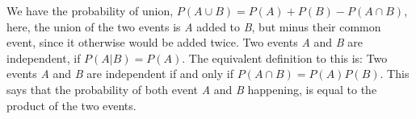 \noindent We have the probability of union,
\newline
$P(A \cup B)=P(A)+P(B)-P(A \cap B)$,
\newline
here, the union of the two events is \textit{A} added to \textit{B}, but minus their common event, since it otherwise would be added twice. 
\newline
\noindent Two events \textit{A} and \textit{B} are independent, if 
\newline
$P(A|B)=P(A)$.
\newline
The equivalent definition to this is:
\newline
\noindent Two events \textit{A} and \textit{B} are independent if and only if
\newline
$P(A \cap B)=P(A)P(B)$.
This says that the probability of both event \textit{A} and \textit{B} happening, is equal to the product of the two events.
